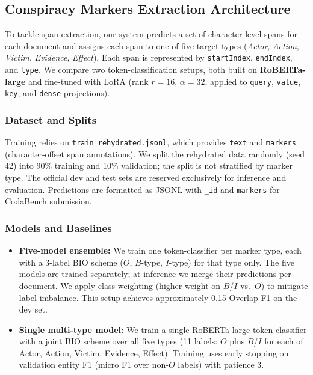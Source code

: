 
\subsection{Conspiracy Markers Extraction Architecture}

To tackle span extraction, our system predicts a set of character-level spans for each document and assigns each span to one of five target types (\textit{Actor}, \textit{Action}, \textit{Victim}, \textit{Evidence}, \textit{Effect}). Each span is represented by \texttt{startIndex}, \texttt{endIndex}, and \texttt{type}. We compare two token-classification setups, both built on \textbf{RoBERTa-large} and fine-tuned with LoRA (rank $r=16$, $\alpha=32$, applied to \texttt{query}, \texttt{value}, \texttt{key}, and \texttt{dense} projections).

\subsubsection{Dataset and Splits}

Training relies on \texttt{train\_rehydrated.jsonl}, which provides \texttt{text} and \texttt{markers} (character-offset span annotations). We split the rehydrated data randomly (seed 42) into 90\% training and 10\% validation; the split is not stratified by marker type. The official dev and test sets are reserved exclusively for inference and evaluation. Predictions are formatted as JSONL with \texttt{\_id} and \texttt{markers} for CodaBench submission.

\subsubsection{Models and Baselines}

\begin{itemize}
    \item \textbf{Five-model ensemble:} We train one token-classifier per marker type, each with a 3-label BIO scheme ($O$, $B$-type, $I$-type) for that type only. The five models are trained separately; at inference we merge their predictions per document. We apply class weighting (higher weight on $B$/$I$ vs.\ $O$) to mitigate label imbalance. This setup achieves approximately 0.15 Overlap F1 on the dev set.
    \item \textbf{Single multi-type model:} We train a single RoBERTa-large token-classifier with a joint BIO scheme over all five types (11 labels: $O$ plus $B$/$I$ for each of Actor, Action, Victim, Evidence, Effect). Training uses early stopping on validation entity F1 (micro F1 over non-$O$ labels) with patience 3.
\end{itemize}

